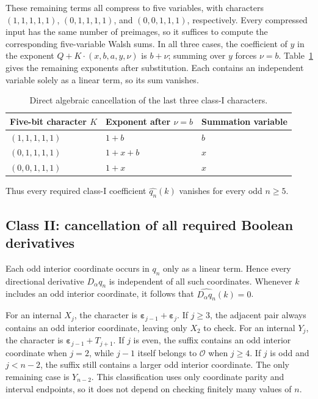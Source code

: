 \documentclass[11pt,a4paper]{article}
\numberwithin{equation}{section}
\theoremstyle{definition}
\newcommand{\Oset}{\mathcal O}
\newcommand{\eps}{\bm\varepsilon}
\begin{document}
These remaining terms all compress to five variables, with characters $(1,1,1,1,1)$, $(0,1,1,1,1)$, and $(0,0,1,1,1)$, respectively. Every compressed input has the same number of preimages, so it suffices to compute the corresponding five-variable Walsh sums. In all three cases, the coefficient of $y$ in the exponent $Q+K\cdot(x,b,a,y,\nu)$ is $b+\nu$; summing over $y$ forces $\nu=b$. Table~\ref{tab:typeI} gives the remaining exponents after substitution. Each contains an independent variable solely as a linear term, so its sum vanishes.

\begin{table}[htbp]
\centering
\caption{Direct algebraic cancellation of the last three class-I characters.}
\label{tab:typeI}
\renewcommand{\arraystretch}{1.2}
\begin{tabular}{@{}lll@{}}
\toprule
Five-bit character $K$ & Exponent after $\nu=b$ & Summation variable\\
\midrule
$(1,1,1,1,1)$ & $1+b$ & $b$\\
$(0,1,1,1,1)$ & $1+x+b$ & $x$\\
$(0,0,1,1,1)$ & $1+x$ & $x$\\
\bottomrule
\end{tabular}
\end{table}

Thus every required class-I coefficient $\widehat {q_n}(k)$ vanishes for every odd $n\geq5$.

\subsection{Class II: cancellation of all required Boolean derivatives}

Each odd interior coordinate occurs in $q_n$ only as a linear term. Hence every directional derivative $D_\alpha q_n$ is independent of all such coordinates. Whenever $k$ includes an odd interior coordinate, it follows that $\widehat {D_\alpha q_n}(k)=0$.

For an internal $X_j$, the character is $\eps_{j-1}+\eps_j$. If $j\geq3$, the adjacent pair always contains an odd interior coordinate, leaving only $X_2$ to check. For an internal $Y_j$, the character is $\eps_{j-1}+T_{j+1}$. If $j$ is even, the suffix contains an odd interior coordinate when $j=2$, while $j-1$ itself belongs to $\Oset$ when $j\geq4$. If $j$ is odd and $j<n-2$, the suffix still contains a larger odd interior coordinate. The only remaining case is $Y_{n-2}$. This classification uses only coordinate parity and interval endpoints, so it does not depend on checking finitely many values of $n$.
\end{document}
